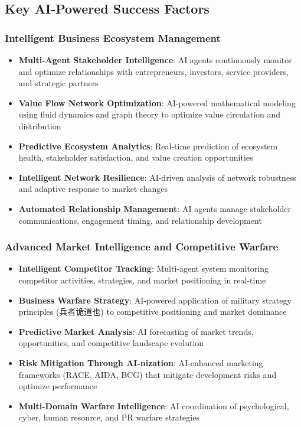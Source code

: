 \subsection{Key AI-Powered Success Factors}

\subsubsection{Intelligent Business Ecosystem Management}

\begin{itemize}
    \item \textbf{Multi-Agent Stakeholder Intelligence}: AI agents continuously monitor and optimize relationships with entrepreneurs, investors, service providers, and strategic partners
    \item \textbf{Value Flow Network Optimization}: AI-powered mathematical modeling using fluid dynamics and graph theory to optimize value circulation and distribution
    \item \textbf{Predictive Ecosystem Analytics}: Real-time prediction of ecosystem health, stakeholder satisfaction, and value creation opportunities
    \item \textbf{Intelligent Network Resilience}: AI-driven analysis of network robustness and adaptive response to market changes
    \item \textbf{Automated Relationship Management}: AI agents manage stakeholder communications, engagement timing, and relationship development
\end{itemize}

\subsubsection{Advanced Market Intelligence and Competitive Warfare}

\begin{itemize}
    \item \textbf{Intelligent Competitor Tracking}: Multi-agent system monitoring competitor activities, strategies, and market positioning in real-time
    \item \textbf{Business Warfare Strategy}: AI-powered application of military strategy principles (兵者诡道也) to competitive positioning and market dominance
    \item \textbf{Predictive Market Analysis}: AI forecasting of market trends, opportunities, and competitive landscape evolution
    \item \textbf{Risk Mitigation Through AI-nization}: AI-enhanced marketing frameworks (RACE, AIDA, BCG) that mitigate development risks and optimize performance
    \item \textbf{Multi-Domain Warfare Intelligence}: AI coordination of psychological, cyber, human resource, and PR warfare strategies
\end{itemize}

